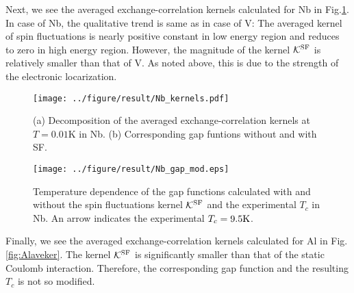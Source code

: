 Next, we see the averaged exchange-correlation kernels calculated for Nb in Fig.\ref{fig:Nbaveker}.
In case of Nb, the qualitative trend is same as in case of V: The averaged kernel of spin fluctuations
is nearly positive constant in low energy region and reduces to zero in high energy region.
However, the magnitude of the kernel $\mathcal K^{\rm SF}$ is relatively smaller than that of V.
As noted above, this is due to the strength of the electronic locarization.
%
\begin{figure}[h]
	\centering
	\texttt{[image: ../figure/result/Nb\_kernels.pdf]}
	\caption{(a) Decomposition of the averaged exchange-correlation kernels
		at $T=0.01$K in Nb. (b) Corresponding gap funtions without 
	and with SF.}
	\label{fig:Nbaveker}
\end{figure}
%
\begin{figure}[h]
	\centering
	\texttt{[image: ../figure/result/Nb\_gap\_mod.eps]}
	\caption{Temperature dependence of the gap functions calculated with and without 
		the spin fluctuations kernel $\mathcal K^{\rm SF}$ and the experimental $T_c$ in Nb.
		An arrow indicates the experimental $T_c = 9.5{\rm K}$.}
	\label{fig:NbgapT}
\end{figure}

Finally, we see the averaged exchange-correlation kernels calculated for Al in Fig.\ref{fig:Alaveker}.
The kernel $\mathcal K^{\rm SF}$ is significantly smaller than that of the static Coulomb interaction.
Therefore, the corresponding gap function and the resulting $T_c$ is not so modified.
%
%

